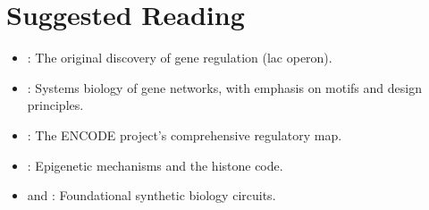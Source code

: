 \section*{Suggested Reading}
\begin{itemize}[leftmargin=1.5em]
  \item \citet{jacob1961}: The original discovery of gene regulation (lac operon).
  \item \citet{alon2019}: Systems biology of gene networks, with emphasis on motifs and design principles.
  \item \citet{encode2012}: The ENCODE project's comprehensive regulatory map.
  \item \citet{allis2016}: Epigenetic mechanisms and the histone code.
  \item \citet{elowitz2000} and \citet{gardner2000}: Foundational synthetic biology circuits.
\end{itemize}

